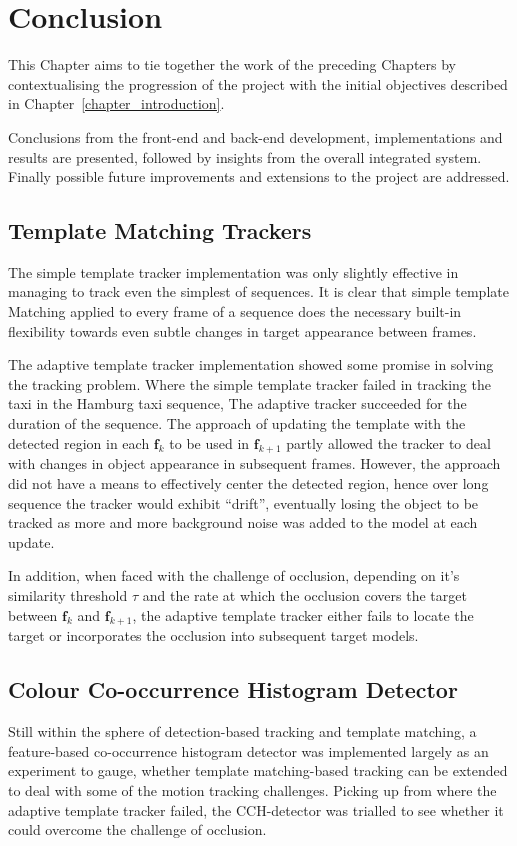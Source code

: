 \chapter{Conclusion}
This Chapter aims to tie together the work of the preceding Chapters
by contextualising the progression of the project with the initial objectives 
described in Chapter~\ref{chapter_introduction}.

Conclusions from the front-end and back-end development, implementations and
results are presented, followed by insights from the overall integrated system.
Finally possible future improvements and extensions to the project are addressed.

\section{Template Matching Trackers}
The simple template tracker implementation was only slightly effective in
managing to track even the simplest of sequences. It is clear that simple template
Matching applied to every frame of a sequence does the necessary built-in
flexibility towards even subtle changes in target appearance between frames.

The adaptive template tracker implementation showed some promise in solving the
tracking problem. Where the simple template tracker failed in tracking the
taxi in the Hamburg taxi sequence, The adaptive tracker succeeded for the
duration of the sequence. 
The approach of updating the template with the detected region in each
$\mathbf{f}_k$ to be used in $\mathbf{f}_{k+1}$ partly allowed the tracker to
deal with changes in object appearance in subsequent frames. However, the
approach did not have a means to effectively center the detected region, hence
over long sequence the tracker would exhibit ``drift'', eventually losing the
object to be tracked as more and more background noise was added to the model at
each update.

In addition, when faced with the challenge of occlusion, depending on it's
similarity threshold $\tau$ and the rate at which the occlusion covers the
target between $\mathbf{f}_k$ and $\mathbf{f}_{k+1}$, the adaptive template
tracker either fails to locate the target or incorporates the occlusion into
subsequent target models.

\section{Colour Co-occurrence Histogram Detector}
Still within the sphere of detection-based tracking and template matching, a
feature-based co-occurrence histogram detector was implemented largely as an
experiment to gauge, whether template matching-based tracking can be extended to deal
with some of the motion tracking challenges. 
Picking up from where the adaptive template tracker failed, the CCH-detector was
trialled to see whether it could overcome the challenge of occlusion.

